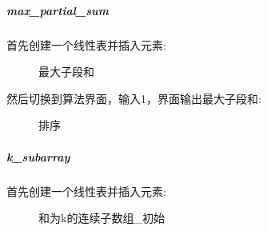 \documentclass[supercite]{Experimental_Report}
\theoremstyle{definition}
\begin{document}
\clearpage
\subparagraph{max\_partial\_sum}
\noindent
首先创建一个线性表并插入元素:
\begin{figure}[htbp]
	\centering
	\centering
	\caption{最大子段和}
	\label{fig4-4}
\end{figure}

\noindent
然后切换到算法界面，输入1，界面输出最大子段和:
\begin{figure}[htbp]
	\centering
	\centering
	\caption{排序}
	\label{fig4-5}
\end{figure}

\subparagraph{k\_subarray}
\noindent
首先创建一个线性表并插入元素:
\begin{figure}[htbp]
	\centering
	\centering
	\caption{和为k的连续子数组\_初始}
	\label{fig4-6}
\end{figure}
\end{document}
